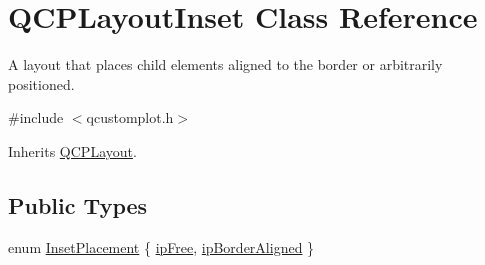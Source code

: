 \hypertarget{class_q_c_p_layout_inset}{\section{Q\-C\-P\-Layout\-Inset Class Reference}
\label{class_q_c_p_layout_inset}
}


A layout that places child elements aligned to the border or arbitrarily positioned.  




{\ttfamily \#include $<$qcustomplot.\-h$>$}



Inherits \hyperlink{class_q_c_p_layout}{Q\-C\-P\-Layout}.

\subsection*{Public Types}
\begin{DoxyCompactItemize}
\item 
enum \hyperlink{class_q_c_p_layout_inset_a8b9e17d9a2768293d2a7d72f5e298192}{Inset\-Placement} \{ \hyperlink{class_q_c_p_layout_inset_a8b9e17d9a2768293d2a7d72f5e298192aa4802986ea2cea457f932b115acba59e}{ip\-Free}, 
\hyperlink{class_q_c_p_layout_inset_a8b9e17d9a2768293d2a7d72f5e298192aa81e7df4a785ddee2229a8f47c46e817}{ip\-Border\-Aligned}
 \}
\end{DoxyCompactItemize}
